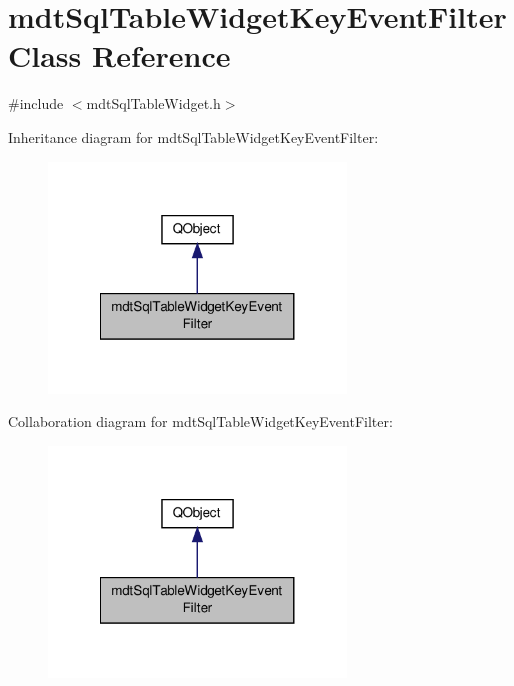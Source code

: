 \hypertarget{classmdt_sql_table_widget_key_event_filter}{\section{mdt\-Sql\-Table\-Widget\-Key\-Event\-Filter Class Reference}
\label{classmdt_sql_table_widget_key_event_filter}
}


{\ttfamily \#include $<$mdt\-Sql\-Table\-Widget.\-h$>$}



Inheritance diagram for mdt\-Sql\-Table\-Widget\-Key\-Event\-Filter\-:
\nopagebreak
\begin{figure}[H]
\begin{center}
\leavevmode
\includegraphics[width=224pt]{classmdt_sql_table_widget_key_event_filter__inherit__graph}
\end{center}
\end{figure}


Collaboration diagram for mdt\-Sql\-Table\-Widget\-Key\-Event\-Filter\-:
\nopagebreak
\begin{figure}[H]
\begin{center}
\leavevmode
\includegraphics[width=224pt]{classmdt_sql_table_widget_key_event_filter__coll__graph}
\end{center}
\end{figure}
